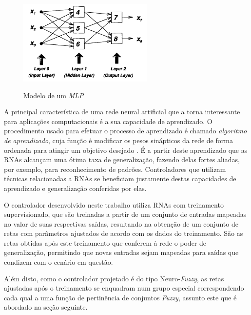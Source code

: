 \begin{figure}[!htb]
    \centering
    \caption{Modelo de um \textit{MLP}}
    \includegraphics[width=0.6\textwidth]{./04-figuras/fund_teorica/rna}
    \label{fig:rna}
\end{figure}

A principal característica de uma rede neural artificial que a torna interessante para aplicações computacionais é a sua capacidade de aprendizado. O procedimento usado para efetuar o processo de aprendizado é chamado \textit{algoritmo de aprendizado}, cuja função é modificar os pesos sinápticos da rede de forma ordenada para atingir um objetivo desejado \cite[p.~24]{Haykin1998}. É a partir deste aprendizado que as RNAs alcançam uma ótima taxa de generalização, fazendo delas fortes aliadas, por exemplo, para reconhecimento de padrões. Controladores que utilizam técnicas relacionadas a RNAs se beneficiam justamente destas capacidades de aprendizado e generalização conferidas por elas.

O controlador desenvolvido neste trabalho utiliza RNAs com treinamento supervisionado, que são treinadas a partir de um conjunto de entradas mapeadas no valor de suas respectivas saídas, resultando na obtenção de um conjunto de retas com parâmetros ajustados de acordo com os dados do treinamento. São as retas obtidas após este treinamento que conferem à rede o poder de generalização, permitindo que novas entradas sejam mapeadas para saídas que condizem com o cenário em questão.

Além disto, como o controlador projetado é do tipo Neuro-\textit{Fuzzy}, as retas ajustadas após o treinamento se enquadram num grupo especial correspondendo cada qual a uma função de pertinência de conjuntos \textit{Fuzzy}, assunto este que é abordado na seção seguinte.
